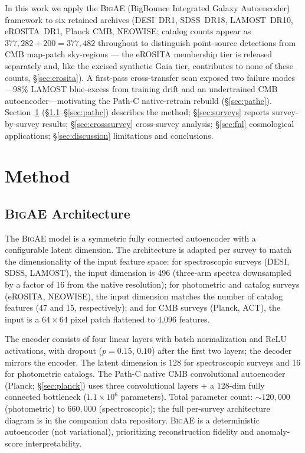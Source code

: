 \documentclass[aps,prd,twocolumn,superscriptaddress,showpacs,preprintnumbers,nofootinbib,longbibliography,floatfix]{revtex4-2}
\newcommand{\BigAE}{\textsc{BigAE}}
\begin{document}
In this work we apply the \BigAE{} (BigBounce Integrated Galaxy Autoencoder) framework to six retained archives (DESI~DR1, SDSS~DR18, LAMOST~DR10, eROSITA~DR1, Planck CMB, NEOWISE; catalog counts appear as $377{,}282 + 200 = 377{,}482$ throughout to distinguish point-source detections from CMB map-patch sky-regions --- the eROSITA membership tier is released separately and, like the excised synthetic Gaia tier, contributes to none of these counts, \S\ref{sec:erosita}). A first-pass cross-transfer scan exposed two failure modes---98\% LAMOST blue-excess from training drift and an undertrained CMB autoencoder---motivating the Path-C native-retrain rebuild (\S\ref{sec:pathc}). Section~\ref{sec:method} (\S\ref{sec:architecture}--\S\ref{sec:pathc}) describes the method; \S\ref{sec:surveys} reports survey-by-survey results; \S\ref{sec:crosssurvey} cross-survey analysis; \S\ref{sec:fnl} cosmological applications; \S\ref{sec:discussion} limitations and conclusions.


\section{Method}\label{sec:method}

\subsection{\BigAE{} Architecture}\label{sec:architecture}

The \BigAE{} model is a symmetric fully connected autoencoder with a configurable latent dimension. The architecture is adapted per survey to match the dimensionality of the input feature space: for spectroscopic surveys (DESI, SDSS, LAMOST), the input dimension is 496 (three-arm spectra downsampled by a factor of 16 from the native resolution); for photometric and catalog surveys (eROSITA, NEOWISE), the input dimension matches the number of catalog features (47 and 15, respectively); and for CMB surveys (Planck, ACT), the input is a $64 \times 64$ pixel patch flattened to 4{,}096 features.

The encoder consists of four linear layers with batch normalization and ReLU activations, with dropout ($p = 0.15$, $0.10$) after the first two layers; the decoder mirrors the encoder. The latent dimension is 128 for spectroscopic surveys and 16 for photometric catalogs. The Path-C native CMB convolutional autoencoder (Planck; \S\ref{sec:planck}) uses three convolutional layers $+$ a 128-dim fully connected bottleneck ($1.1\!\times\!10^6$ parameters). Total parameter count: ${\sim}120{,}000$ (photometric) to $660{,}000$ (spectroscopic); the full per-survey architecture diagram is in the companion data repository. \BigAE{} is a deterministic autoencoder (not variational), prioritizing reconstruction fidelity and anomaly-score interpretability.
\end{document}
